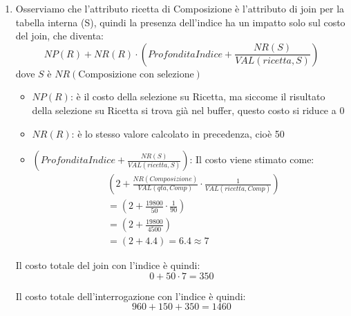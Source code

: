 \documentclass[a4paper,twoside]{article}
\begin{document}
\begin{exercise}
\begin{enumerate}
\begin{enumerate}
\begin{itemize}
            \item \( NP(S) \): è il numero di pagine del risultato della selezione su
              Composizione, che è 180
          \end{itemize}
          Il costo totale del join è quindi:
          \[
            0 + 50 \cdot 180 = 9000
          \] 
      \end{enumerate}
      Il costo totale della query è quindi la somma dei costi di ogni singola
      operazione:
      \[
        960 + 150 + 9000 = 10110
      \] 

    \item Osserviamo che l'attributo ricetta di Composizione è l'attributo
      di join per la tabella interna (S), quindi la presenza dell'indice
      ha un impatto solo sul costo del join, che diventa:
      \[
        NP(R) + NR(R) \cdot \left( ProfonditaIndice + \frac{NR(S)}{VAL(ricetta, S)} \right)
      \] 
      dove \( S \) è \( NR(\text{Composizione con selezione}) \) 
      \begin{itemize}
        \item \( NP(R) \): è il costo della selezione su Ricetta, ma siccome il risultato
          della selezione su Ricetta si trova già nel buffer, questo costo si riduce a 0

        \item \( NR(R) \): è lo stesso valore calcolato in precedenza, cioè 50

        \item \( \left( ProfonditaIndice + \frac{NR(S)}{VAL(ricetta, S)} \right) \):
          Il costo viene stimato come:
          \[
            \begin{aligned}
              &\left( 2 + \frac{NR(Composizione)}{VAL(qta, Comp)}
              \cdot \frac{1}{VAL(ricetta, Comp)} \right)\\
              &= \left( 2 + \frac{19800}{50} \cdot \frac{1}{90} \right) \\
              &= \left( 2 + \frac{19800}{4500} \right) \\
              &= \left( 2 + 4.4 \right) = 6.4 \approx 7
            \end{aligned}
          \] 
      \end{itemize}
      Il costo totale del join con l'indice è quindi:
      \[
        0 + 50 \cdot 7 = 350
      \]

      \vspace{1em}
      \noindent
      Il costo totale dell'interrogazione con l'indice è quindi:
      \[
        960 + 150 + 350 = 1460
      \]
  \end{enumerate}
\end{exercise}
\end{document}
